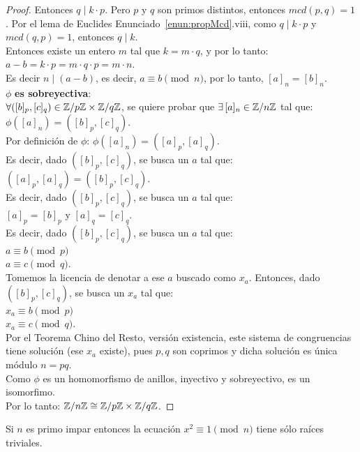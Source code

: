 \begin{proof}
Entonces $q \mid k \cdot p$. Pero $p$ y $q$ son primos distintos, entonces $mcd(p,q) = 1$. Por el lema de Euclides Enunciado~\ref{enun:propMcd}.viii, como $q \mid k \cdot p$ y $mcd(q,p) = 1$, entonces $q \mid  k$. \\
Entonces existe un entero $m$ tal que $k = m \cdot q$, y por lo tanto: \\
$a - b = k \cdot p = m \cdot q \cdot p = m \cdot n$. \\
Es decir $n \mid (a-b)$, es decir, $a \equiv b \pmod n$, por lo tanto, $[a]_n = [b]_n$.\\
$\phi$ \textbf{es sobreyectiva}: \\
$\forall ([b]_p, [c]_q) \in \mathbb{Z}/p\mathbb{Z} \times \mathbb{Z}/q\mathbb{Z}$, se quiere probar que  $\exists \, [a]_n \in \mathbb{Z}/n\mathbb{Z}$ tal que: \\
$\phi ([a]_n) = ([b]_p, [c]_q)$. \\
Por definición de $\phi$: $\phi ([a]_n) = ([a]_p, [a]_q)$. \\
Es decir, dado $([b]_p, [c]_q)$, se busca un $a$ tal que: \\
$([a]_p, [a]_q)= ([b]_p, [c]_q)$. \\
Es decir, dado $([b]_p, [c]_q)$, se busca un $a$ tal que: \\
$[a]_p = [b]_p$ y $[a]_q = [c]_q$. \\
Es decir, dado $([b]_p, [c]_q)$, se busca un $a$ tal que: \\
$a \equiv b \pmod p$ \\
$a \equiv c \pmod q$. \\
Tomemos la licencia de denotar a ese $a$ buscado como $x_a$. Entonces, dado $([b]_p, [c]_q)$, se busca un $x_a$ tal que: \\
$x_a \equiv b \pmod p$ \\
$x_a \equiv c \pmod q$. \\
Por el Teorema Chino del Resto, versión existencia, este sistema de congruencias tiene solución (ese $x_a$ existe), pues $p,q$ son coprimos y dicha solución es única módulo $n=pq$. \\

Como $\phi$  es un homomorfismo de anillos, inyectivo y sobreyectivo, es un isomorfimo. \\
Por lo tanto: $\mathbb{Z}/n\mathbb{Z} \cong \mathbb{Z}/p\mathbb{Z} \times \mathbb{Z}/q\mathbb{Z}$.
\end{proof}

\begin{enunciado} \label{enun:raiz1modp}\leavevmode\par
Si $n$ es primo impar entonces la ecuación $x^2 \equiv 1 \pmod n$ tiene sólo raíces triviales.
\end{enunciado}

